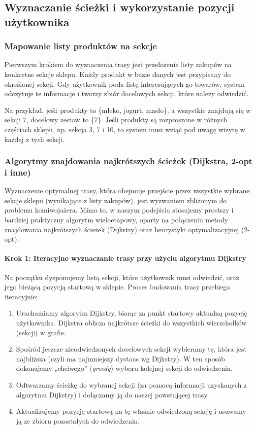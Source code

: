 \subsection{Wyznaczanie ścieżki i wykorzystanie pozycji użytkownika}

\subsubsection{Mapowanie listy produktów na sekcje}
Pierwszym krokiem do wyznaczenia trasy jest przełożenie listy zakupów na konkretne sekcje sklepu. Każdy produkt w bazie danych jest przypisany do określonej sekcji. Gdy użytkownik poda listę interesujących go towarów, system odczytuje te informacje i tworzy zbiór docelowych sekcji, które należy odwiedzić.

Na przykład, jeśli produkty to \{mleko, jogurt, masło\}, a wszystkie znajdują się w sekcji 7, docelowy zestaw to \{7\}. Jeśli produkty są rozproszone w różnych częściach sklepu, np. sekcja 3, 7 i 10, to system musi wziąć pod uwagę wizytę w każdej z tych sekcji.

\subsubsection{Algorytmy znajdowania najkrótszych ścieżek (Dijkstra, 2-opt i inne)}
Wyznaczenie optymalnej trasy, która obejmuje przejście przez wszystkie wybrane sekcje sklepu (wynikające z listy zakupów), jest wyzwaniem zbliżonym do problemu komiwojażera. Mimo to, w naszym podejściu stosujemy prostszy i bardziej praktyczny algorytm wieloetapowy, oparty na połączeniu metody znajdowania najkrótszych ścieżek (Dijkstry) oraz heurystyki optymalizacyjnej (2-opt).

\paragraph{Krok 1: Iteracyjne wyznaczanie trasy przy użyciu algorytmu Dijkstry}
Na początku dysponujemy listą sekcji, które użytkownik musi odwiedzić, oraz jego bieżącą pozycją startową w sklepie. Proces budowania trasy przebiega iteracyjnie:
\begin{enumerate}
    \item Uruchamiamy algorytm Dijkstry, biorąc za punkt startowy aktualną pozycję użytkownika. Dijkstra oblicza najkrótsze ścieżki do wszystkich wierzchołków (sekcji) w grafie.
    \item Spośród jeszcze nieodwiedzonych docelowych sekcji wybieramy tę, która jest najbliższa (czyli ma najmniejszy dystans wg Dijkstry). W ten sposób dokonujemy „chciwego” (\emph{greedy}) wyboru kolejnej sekcji do odwiedzenia.
    \item Odtwarzamy ścieżkę do wybranej sekcji (za pomocą informacji uzyskanych z algorytmu Dijkstry) i dołączamy ją do naszej powstającej trasy.
    \item Aktualizujemy pozycję startową na tę właśnie odwiedzoną sekcję i usuwamy ją ze zbioru pozostałych do odwiedzenia.
\end{enumerate}

